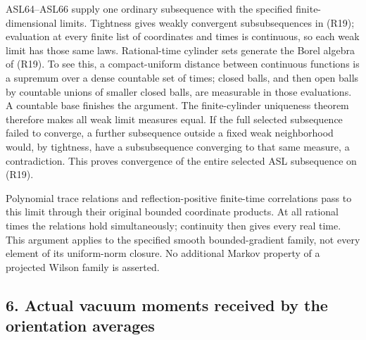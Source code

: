 \documentclass[11pt]{article}
\begin{document}
ASL64–ASL66 supply one ordinary subsequence with the specified
finite-dimensional limits. Tightness gives weakly convergent
subsubsequences in (R19); evaluation at every finite list of coordinates
and times is continuous, so each weak limit has those same laws.
Rational-time cylinder sets generate the Borel algebra of (R19).
To see this, a compact-uniform distance between continuous functions
is a supremum over a dense countable set of times; closed balls,
and then open balls by countable unions of smaller closed balls,
are measurable in those evaluations. A countable base finishes the
argument. The finite-cylinder uniqueness theorem therefore makes all
weak limit measures equal. If the full selected subsequence failed
to converge, a further subsequence outside a fixed weak neighborhood
would, by tightness, have a subsubsequence converging to that same
measure, a contradiction. This proves convergence of the entire
selected ASL subsequence on (R19).

Polynomial trace relations and reflection-positive finite-time
correlations pass to this limit through their original bounded
coordinate products. At all rational times the relations hold
simultaneously; continuity then gives every real time. This argument
applies to the specified smooth bounded-gradient family, not every
element of its uniform-norm closure. No additional Markov property
of a projected Wilson family is asserted.

\subsection*{6. Actual vacuum moments received by the orientation averages}
\end{document}
